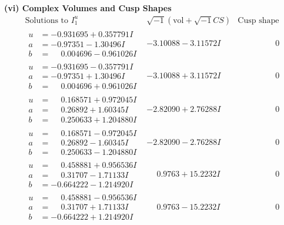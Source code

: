 \documentclass[1p]{elsarticle_modified}
\theoremstyle{definition}
\newcommand{\I}{\sqrt{-1}}
\begin{document}
\newpage\flushleft \textbf{(vi) Complex Volumes and Cusp Shapes}
$$\begin{array}{c|c|c}  
\text{Solutions to }I^u_{1}& \I (\text{vol} + \sqrt{-1}CS) & \text{Cusp shape}\\
 \hline 
\begin{aligned}
u &= -0.931695 + 0.357791 I \\
a &= -0.97351 - 1.30496 I \\
b &= \phantom{-}0.004696 - 0.961026 I\end{aligned}
 & -3.10088 - 3.11572 I & \phantom{-0.000000 } 0 \\ \hline\begin{aligned}
u &= -0.931695 - 0.357791 I \\
a &= -0.97351 + 1.30496 I \\
b &= \phantom{-}0.004696 + 0.961026 I\end{aligned}
 & -3.10088 + 3.11572 I & \phantom{-0.000000 } 0 \\ \hline\begin{aligned}
u &= \phantom{-}0.168571 + 0.972045 I \\
a &= \phantom{-}0.26892 + 1.60345 I \\
b &= \phantom{-}0.250633 + 1.204880 I\end{aligned}
 & -2.82090 + 2.76288 I & \phantom{-0.000000 } 0 \\ \hline\begin{aligned}
u &= \phantom{-}0.168571 - 0.972045 I \\
a &= \phantom{-}0.26892 - 1.60345 I \\
b &= \phantom{-}0.250633 - 1.204880 I\end{aligned}
 & -2.82090 - 2.76288 I & \phantom{-0.000000 } 0 \\ \hline\begin{aligned}
u &= \phantom{-}0.458881 + 0.956536 I \\
a &= \phantom{-}0.31707 - 1.71133 I \\
b &= -0.664222 - 1.214920 I\end{aligned}
 & \phantom{-}0.9763 + 15.2232 I & \phantom{-0.000000 } 0 \\ \hline\begin{aligned}
u &= \phantom{-}0.458881 - 0.956536 I \\
a &= \phantom{-}0.31707 + 1.71133 I \\
b &= -0.664222 + 1.214920 I\end{aligned}
 & \phantom{-}0.9763 - 15.2232 I & \phantom{-0.000000 } 0 \\ \hline\begin{aligned}

\end{aligned}
\end{array}$$
\end{document}
